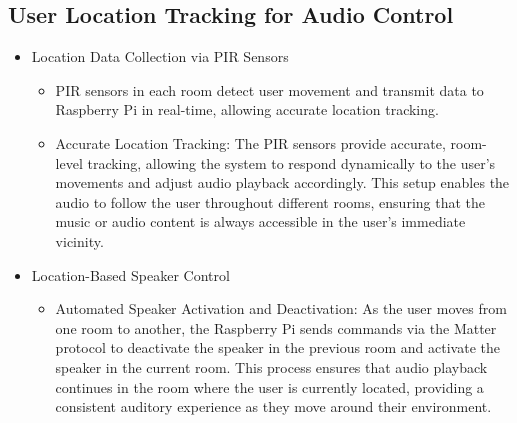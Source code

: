 \documentclass[conference]{IEEEtran}
\begin{document}
\subsection{User Location Tracking for Audio Control}
\begin{itemize}
    \item Location Data Collection via PIR Sensors
\begin{itemize}
    \item PIR sensors in each room detect user movement and transmit data to Raspberry Pi in real-time, allowing accurate location tracking.\\
    \item Accurate Location Tracking: The PIR sensors provide accurate, room-level tracking, allowing the system to respond dynamically to the user’s movements and adjust audio playback accordingly. This setup enables the audio to follow the user throughout different rooms, ensuring that the music or audio content is always accessible in the user’s immediate vicinity.\\
\end{itemize}
\end{itemize}
\begin{itemize}
    \item Location-Based Speaker Control
\begin{itemize}
    \item Automated Speaker Activation and Deactivation: As the user moves from one room to another, the Raspberry Pi sends commands via the Matter protocol to deactivate the speaker in the previous room and activate the speaker in the current room. This process ensures that audio playback continues in the room where the user is currently located, providing a consistent auditory experience as they move around their environment.\\
\end{itemize}
\end{itemize}
\end{document}
